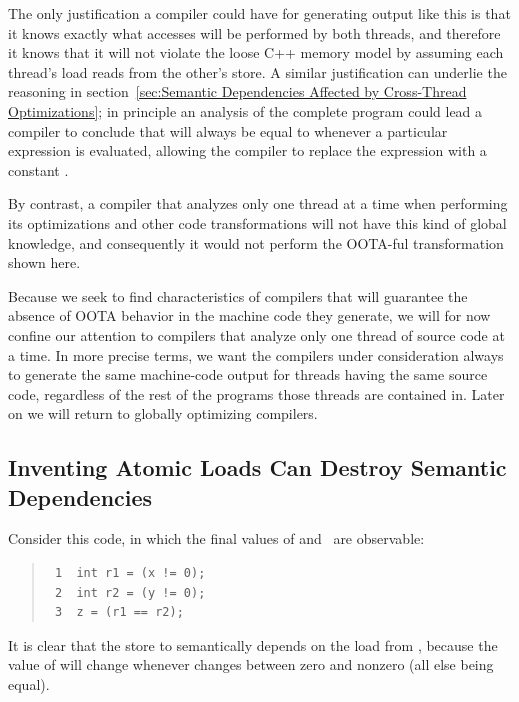 \documentclass[10]{article}
\begin{document}
The only justification a compiler could have for generating output like
this is that it knows exactly what accesses will be performed by both
threads, and therefore it knows that it will not violate the loose C++
memory model by assuming each thread's load reads from the other's
store.
A similar justification can underlie the reasoning in
section~\ref{sec:Semantic Dependencies Affected by Cross-Thread Optimizations};
in principle an analysis of the complete program could lead a compiler
to conclude that  will always be equal to  whenever a
particular  expression is evaluated, allowing the compiler
to replace the expression with a constant .

By contrast, a compiler that analyzes only one thread at a time when
performing its optimizations and other code transformations will not
have this kind of global knowledge, and consequently it would not
perform the OOTA-ful transformation shown here.

Because we seek to find characteristics of compilers that will
guarantee the absence of OOTA behavior in the machine code they generate,
we will for now confine our attention to compilers that analyze only
one thread of source code at a time.
In more precise terms, we want the compilers under consideration
always to generate the same machine-code output for threads having
the same source code, regardless of the rest of the programs
those threads are contained in.
Later on we will return to globally optimizing compilers.

\subsection{Inventing Atomic Loads Can Destroy Semantic Dependencies}
\label{sec:Inventing Atomic Loads Can Destroy Semantic Dependencies}

Consider this code, in which the final values of  and~
are observable:
\begin{quote}
\begin{verbatim}
 1  int r1 = (x != 0);
 2  int r2 = (y != 0);
 3  z = (r1 == r2);
\end{verbatim}
\end{quote}
It is clear that the store to  semantically depends on the load
from , because the value of  will change whenever 
changes between zero and nonzero (all else being equal).
\end{document}
